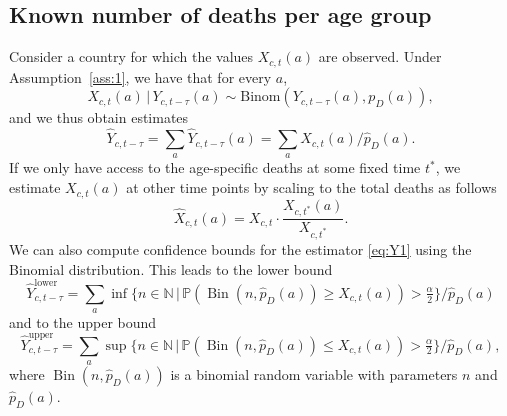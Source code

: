 \documentclass[a4paper]{article}
\newcommand\N{\mathbb{N}}
\renewcommand\P{\mathbb{P}}
\newcommand{\given}{\, \vert \,}
\newcommand\Rune[1]{{\color{blue}Rune: #1}}
\begin{document}
\subsection{Known number of deaths per age group} \label{sec:known}
%
Consider a country for which the values $X_{c,t}(a)$ are observed. 
Under Assumption~\ref{ass:1}, we have that for every $a$, 
$$X_{c,t}(a) \given Y_{c,t-\tau}(a) \sim \text{Binom}(Y_{c,t-\tau}(a), p_D(a)),$$
and we thus obtain estimates
\begin{equation}
  \label{eq:Y1}
  \hat{Y}_{c,t-\tau} = \sum_a \hat{Y}_{c,t-\tau}(a) =\sum_a
  X_{c,t}(a) / \hat  p_D(a).
\end{equation}
If we only have access to the age-specific deaths at some fixed time
$t^*$, we estimate $X_{c,t}(a)$ at other time points by scaling to the total deaths as follows
\begin{equation*}
  \hat{X}_{c,t}(a)=X_{c,t}\cdot\frac{X_{c,t^*}(a)}{X_{c,t^*}}.
\end{equation*}
We can also compute confidence bounds for the estimator \eqref{eq:Y1}
using the Binomial distribution. This leads to the lower bound
\begin{equation*}
  \hat{Y}_{c,t-\tau}^{\text{lower}} = \sum_a \inf\{n\in\N \,\vert\,
  \P(\operatorname{Bin}(n, \hat{p}_D(a))\geq
  X_{c,t}(a))>\tfrac{\alpha}{2}\} / \hat  p_D(a)
\end{equation*}
and to the upper bound
\begin{equation*}
  \hat{Y}_{c,t-\tau}^{\text{upper}} = \sum_a \sup\{n\in\N \,\vert\, \P(\operatorname{Bin}(n, \hat{p}_D(a))\leq
  X_{c,t}(a))>\tfrac{\alpha}{2}\} / \hat  p_D(a),
\end{equation*}
where $\operatorname{Bin}(n, \hat{p}_D(a))$ is a binomial random
variable with parameters $n$ and $\hat{p}_D(a)$.

\end{document}
